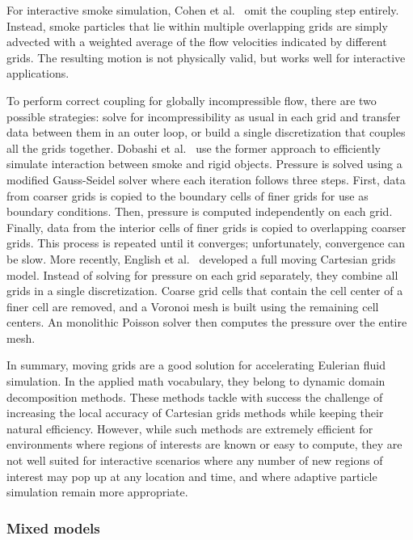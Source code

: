 For interactive smoke simulation, Cohen et al.~\cite{Cohen2010} omit the coupling step entirely.
Instead, smoke particles that lie within multiple overlapping grids are simply advected with a weighted average of the flow velocities indicated by different grids.
The resulting motion is not physically valid, but works well for interactive applications.

To perform correct coupling for globally incompressible flow, there are two possible strategies: solve for incompressibility as usual in each grid and transfer data between them in an outer loop, or build a single discretization that couples all the grids together.
Dobashi et al.~\cite{Dobashi2008} use the former approach to efficiently simulate interaction between smoke and rigid objects. Pressure is solved using a modified Gauss-Seidel solver where each iteration follows three steps.
First, data from coarser grids is copied to the boundary cells of finer grids for use as boundary conditions.
Then, pressure is computed independently on each grid.
Finally, data from the interior cells of finer grids is copied to overlapping coarser grids.
This process is repeated until it converges; unfortunately, convergence can be slow.
More recently, English et al.~\cite{English2013} developed a full moving Cartesian grids model.
Instead of solving for pressure on each grid separately, they combine all grids in a single discretization.
Coarse grid cells that contain the cell center of a finer cell are removed, and a Voronoi mesh is built using the remaining cell centers.
An monolithic Poisson solver then computes the pressure over the entire mesh.

In summary, moving grids are a good solution for accelerating Eulerian fluid simulation. In the applied math vocabulary, they belong to dynamic domain decomposition methods.
These methods tackle with success the challenge of increasing the local accuracy of Cartesian grids methods while keeping their natural efficiency. However, while such methods are extremely efficient for environments where regions of interests are known or easy to compute, they are not well suited for interactive scenarios where any number of new regions of interest may pop up at any location and time, and where adaptive particle simulation remain more appropriate.

\subsubsection{Mixed models}
\label{sec:mixed-models}

